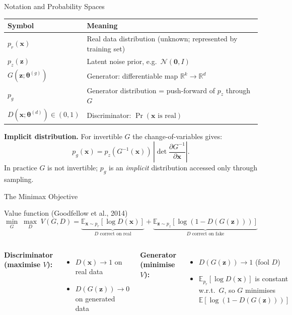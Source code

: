 \documentclass[aspectratio=169,11pt]{beamer}
\newcommand{\E}{\mathbb{E}}
\newcommand{\R}{\mathbb{R}}
\newcommand{\bx}{\bm{x}}
\newcommand{\bz}{\bm{z}}
\newcommand{\btheta}{\bm{\theta}}
\newcommand{\pr}{p_{r}}           %
\newcommand{\pg}{p_{g}}           %
\newcommand{\pz}{p_{z}}           %
\begin{document}
\begin{frame}{Notation and Probability Spaces}
  \begin{center}
  \renewcommand{\arraystretch}{1.25}
  \begin{tabular}{ll}
    \toprule
    Symbol & Meaning\\
    \midrule
    $\pr(\bx)$ & Real data distribution (unknown; represented by training set)\\
    $\pz(\bz)$ & Latent noise prior, e.g.\ $\mathcal{N}(\mathbf{0},I)$\\
    $G(\bz;\btheta^{(g)})$ & Generator: differentiable map $\R^k\to\R^d$\\
    $\pg$ & Generator distribution = push-forward of $\pz$ through $G$\\
    $D(\bx;\btheta^{(d)})\in(0,1)$ & Discriminator: $\Pr(\bx\text{ is real})$\\
    \bottomrule
  \end{tabular}
  \end{center}

  \medskip
  \textbf{Implicit distribution.} For invertible $G$ the change-of-variables gives:
  \[
    \pg(\bx) = \pz\!\left(G^{-1}(\bx)\right)\,
    \left|\det\frac{\partial G^{-1}}{\partial\bx}\right|.
  \]
  In practice $G$ is not invertible; $\pg$ is an \emph{implicit} distribution
  accessed only through sampling.
\end{frame}

\begin{frame}{The Minimax Objective}
  \begin{block}{Value function (Goodfellow et al., 2014)}
    \[
      \boxed{
        \min_{G}\;\max_{D}\;V(G,D)
        = \underbrace{\E_{\bx\sim\pr}[\log D(\bx)]}_{\text{$D$ correct on real}}
        + \underbrace{\E_{\bz\sim\pz}[\log(1-D(G(\bz)))]}_{\text{$D$ correct on fake}}
      }
    \]
  \end{block}

  \medskip
  \begin{columns}[T]
      \textbf{Discriminator (maximise $V$):}
      \begin{itemize}
        \item $D(\bx)\to 1$ on real data
        \item $D(G(\bz))\to 0$ on generated data
      \end{itemize}
      \textbf{Generator (minimise $V$):}
      \begin{itemize}
        \item $D(G(\bz))\to 1$ (fool $D$)
        \item $\E_{\pr}[\log D(\bx)]$ is constant w.r.t.\ $G$,
              so $G$ minimises $\E[\log(1-D(G(\bz)))]$
      \end{itemize}
  \end{columns}
\end{frame}
\end{document}
